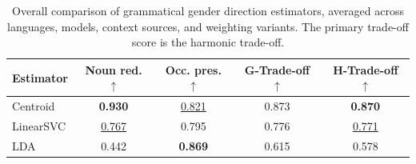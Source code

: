 \begin{table}[t]
\centering
\small
\caption{Overall comparison of grammatical gender direction estimators, averaged across languages, models, context sources, and weighting variants. The primary trade-off score is the harmonic trade-off.}
\label{tab:estimator_overall}
\begin{tabular}{lcccc}
\toprule
Estimator & Noun red. $\uparrow$ & Occ. pres. $\uparrow$ & G-Trade-off $\uparrow$ & H-Trade-off $\uparrow$ \\
\midrule
Centroid & \textbf{0.930} & \underline{0.821} & 0.873 & \textbf{0.870} \\
LinearSVC & \underline{0.767} & 0.795 & 0.776 & \underline{0.771} \\
LDA & 0.442 & \textbf{0.869} & 0.615 & 0.578 \\
\bottomrule
\end{tabular}
\end{table}
